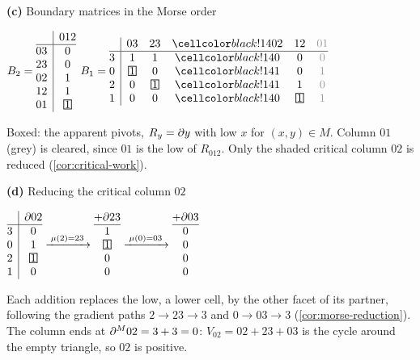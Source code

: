 {\bigskip
%
\begin{minipage}[t]{0.5\textwidth}
\textbf{(c)} Boundary matrices in the Morse order\par\medskip
\centering
$B_2=\begin{array}{@{}r|c@{}}
    & 012\\ \hline
    03 & 0\\
    23 & 0\\
    02 & 1\\
    12 & 1\\
    01 & \pv{1}\end{array}$\qquad
$B_1=\begin{array}{@{}r|ccccc@{}}
    & 03 & 23 & \cc 02 & 12 & \gz{01}\\ \hline
    3 & 1 & 1 & \cc 0 & 0 & \gz{0}\\
    0 & \pv{1} & 0 & \cc 1 & 0 & \gz{1}\\
    2 & 0 & \pv{1} & \cc 1 & 1 & \gz{0}\\
    1 & 0 & 0 & \cc 0 & \pv{1} & \gz{1}\end{array}$\par\smallskip
\raggedright{\scriptsize Boxed: the apparent pivots, $R_y=\partial y$ with low
$x$ for $(x,y)\in M$. Column $01$ (grey) is cleared, since $01$ is the low of
$R_{012}$. Only the shaded critical column $02$ is reduced
(\cref{cor:critical-work}).}
\end{minipage}\hfill
%
\begin{minipage}[t]{0.46\textwidth}
\textbf{(d)} Reducing the critical column $02$\par\medskip
\centering
$\begin{array}{@{}r|c@{}}
    & \bd 02\\ \hline
    3 & 0\\
    0 & 1\\
    2 & \pv{1}\\
    1 & 0\end{array}
\xrightarrow{\;\mu(2)=23\;}
\begin{array}{@{}c@{}}
    {+}\bd 23\\ \hline
    1\\
    \pv{1}\\
    0\\
    0\end{array}
\xrightarrow{\;\mu(0)=03\;}
\begin{array}{@{}c@{}}
    {+}\bd 03\\ \hline
    0\\
    0\\
    0\\
    0\end{array}$\par\smallskip
\raggedright{\scriptsize Each addition replaces the low, a lower cell, by the
other facet of its partner, following the gradient paths $2\to23\to3$ and
$0\to03\to3$ (\cref{cor:morse-reduction}). The column ends at
$\partial^{M} 02=3+3=0$: $V_{02}=02+23+03$ is the cycle around the empty triangle, so
$02$ is positive.}
\end{minipage}}%

